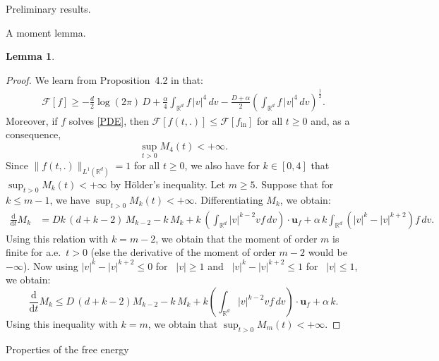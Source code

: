 \documentclass[reqno]{amsart} %
\newtheorem{lemma}{Lemma}[section]
\begin{document}
\begin{section}{Preliminary results.}
\begin{subsection}{A moment lemma.}
\begin{lemma}
\end{lemma}
\begin{proof}
    We learn from Proposition~4.2 in \cite{Li2021} that:
    \begin{align}
    \label{bddbelow}
        \mathcal{F}[f] \geq -\frac{d}{2}\log(2\pi)\,D + \frac{\alpha}{4} \int_{\mathbb{R}^d}f\,|v|^4\,dv - \frac{D+\alpha}{2} \left( \int_{\mathbb{R}^d}f\,|v|^4\,dv\right)^\frac{1}{2}.
    \end{align}
Moreover, if $f$ solves \eqref{PDE}, then $\mathcal{F}[f(t,.)]\leq \mathcal{F}[f_{\mathrm{in}}] $ for all $t\geq 0$ and, as a consequence, $$\sup_{t>0}M_4(t)<+\infty.$$ Since $\lVert f(t,.)\rVert_{L^1(\mathbb{R}^d)}=1$ for all $t \geq 0$, we also have for $k\in [0,4]$ that $\sup_{t>0}M_k(t)<+\infty$ by Hölder's inequality.  Let $m \geq 5$. Suppose that for $k \leq m-1$, we have $\sup_{t>0}M_k(t)<+\infty$. Differentiating $M_k$, we obtain:
 \begin{align*}
 \frac{\mathrm{d}}{\mathrm{d}t} M_k&= Dk\,(d+k-2)\,M_{k-2} -k \,M_k +k\,\left(\int_{\mathbb{R}^d}|v|^{k-2}vf\, dv\right) \cdot \mathbf{u}_{f}  + \alpha\, k \int_{\mathbb{R}^d} (|v|^k-|v|^{k+2})f\,dv.
 \end{align*}
 Using this relation with $k=m-2$, we obtain that the moment of order $m$ is finite for a.e.~$t>0$ (else the derivative of the moment of order $m-2$ would be $-\infty$). Now using $|v|^k-|v|^{k+2} \leq 0 $ for ~$|v|\geq 1$ and ~$|v|^k-|v|^{k+2} \leq 1$ for ~$|v|\leq 1$, we obtain:
\[
\frac{\mathrm{d}}{\mathrm{d}t} M_k \leq D\,(d+k-2)M_{k-2} -k\, M_k +k \left(\int_{\mathbb{R}^d}|v|^{k-2}vf \,dv\right) \cdot \mathbf{u}_{f}  + \alpha \,k.
\]
 Using this inequality with $k=m$, we obtain that $\sup_{t>0}M_m(t) <+\infty$.
\end{proof}
\end{subsection}


\begin{subsection}{Properties of the free energy}
    


\end{subsection}
\end{section}
\end{document}
